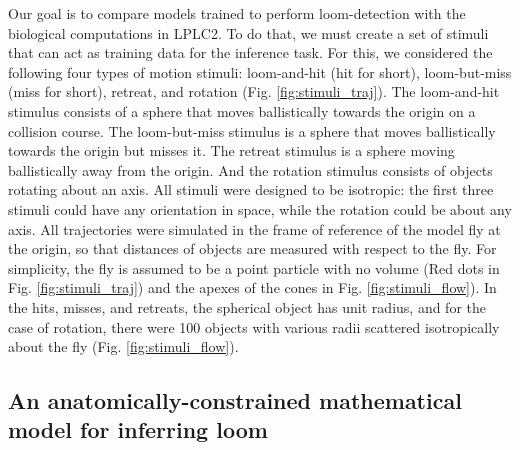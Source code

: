 \documentclass[9pt,lineno]{elife}
\begin{document}
Our goal is to compare models trained to perform loom-detection with the biological computations in LPLC2. To do that, we must create a set of stimuli that can act as training data for the inference task. For this, we considered the following four types of motion stimuli: loom-and-hit (hit for short), loom-but-miss (miss for short), retreat, and rotation (Fig. \ref{fig:stimuli_traj}). The loom-and-hit stimulus consists of a sphere that moves ballistically towards the origin on a collision course. The loom-but-miss stimulus is a sphere that moves ballistically towards the origin but misses it. The retreat stimulus is a sphere moving ballistically away from the origin. And the rotation stimulus consists of objects rotating about an axis. All stimuli were designed to be isotropic: the first three stimuli could have any orientation in space, while the rotation could be about any axis. All trajectories were simulated in the frame of reference of the model fly  at the origin, so that distances of objects are measured with respect to the fly. For simplicity, the fly is assumed to be a point particle with no volume (Red dots in Fig. \ref{fig:stimuli_traj}) and the apexes of the cones in Fig. \ref{fig:stimuli_flow}). In the hits, misses, and retreats, the spherical object has unit radius, and for the case of rotation, there were 100 objects with various radii scattered isotropically about the fly (Fig. \ref{fig:stimuli_flow}).



\subsection{An anatomically-constrained mathematical model for inferring loom}
\end{document}
